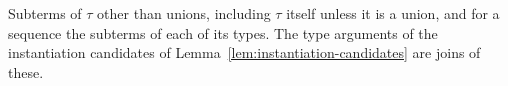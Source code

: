 Subterms of $\tau$ other than unions, including $\tau$ itself unless it is a union, and for a sequence
the subterms of each of its types. The type arguments of the instantiation candidates of Lemma~\ref{lem:instantiation-candidates} are joins of
these.
